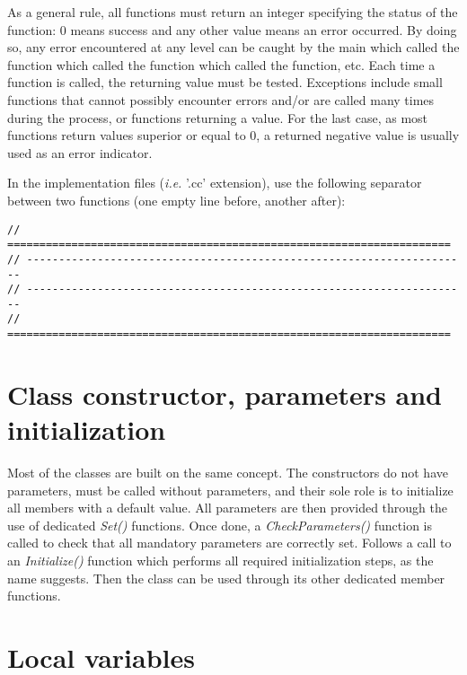 \documentclass[a4paper, 11pt]{article}
\begin{document}
As a general rule, all functions must return an integer specifying the status of the function: 0 means success and any other value means an error occurred.
By doing so, any error encountered at any level can be caught by the main which called the function which called the function which called the function, etc.
Each time a function is called, the returning value must be tested.
Exceptions include small functions that cannot possibly encounter errors and/or are called many times during the process, or functions returning a value. For the last case, as most functions return values superior or equal to 0, a returned negative value is usually used as an error indicator.

In the implementation files (\textit{i.e.} '.cc' extension), use the following separator between two functions (one empty line before, another after):
\begin{lstlisting}[label={function_separator},caption=Functions separator.]
// =====================================================================
// ---------------------------------------------------------------------
// ---------------------------------------------------------------------
// =====================================================================
\end{lstlisting}

\section{Class constructor, parameters and initialization}

Most of the classes are built on the same concept. The constructors do not have parameters, must be called without parameters,
and their sole role is to initialize all members with a default value. All parameters are then provided through the use of dedicated \textit{Set()} functions. Once done,
a \textit{CheckParameters()} function is called to check that all mandatory parameters are correctly set. Follows a call to an \textit{Initialize()} function which performs all required initialization steps, as the name suggests. Then the class can be used through its other dedicated member functions.

\section{Local variables}
\end{document}
